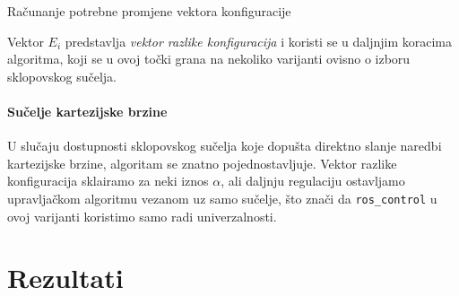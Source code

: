 \documentclass[times, utf8, diplomski, numeric]{fer}
\begin{document}
\begin{algorithm}[H]
\caption{Računanje potrebne promjene vektora konfiguracije}
\begin{algorithmic}
\ENDIF
{}
\ENDIF
{}
\ENDFOR
\end{algorithmic}
\end{algorithm}

Vektor $E_i$ predstavlja \textit{vektor razlike konfiguracija} i koristi se u daljnjim koracima algoritma, koji se u ovoj točki grana na nekoliko varijanti ovisno o izboru sklopovskog sučelja.

\subsubsection{Sučelje kartezijske brzine}
U slučaju dostupnosti sklopovskog sučelja koje dopušta direktno slanje naredbi kartezijske brzine, algoritam se znatno pojednostavljuje.
Vektor razlike konfiguracija sklairamo za neki iznos $\alpha$, ali daljnju regulaciju ostavljamo upravljačkom algoritmu vezanom uz samo sučelje, što znači da \verb|ros_control| u ovoj varijanti koristimo samo radi univerzalnosti.









\chapter{Rezultati}
\end{document}
